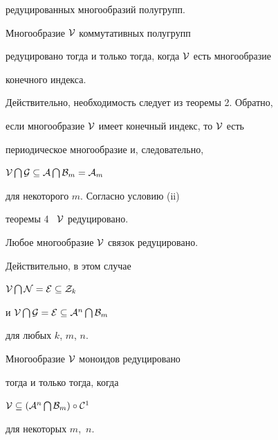 редуцированных многообразий полугрупп.





\begin{cor}


Многообразие ${\cal V}$ коммутативных полугрупп


редуцировано тогда и только тогда, когда ${\cal V}$ есть многообразие


конечного индекса.


\end{cor} 





Действительно, необходимость следует из теоремы 2. Обратно,


если многообразие ${\cal V}$ имеет конечный индекс, то ${\cal V}$ есть


периодическое многообразие и, следовательно,


${\cal V}\bigcap {\cal G} \subseteq {\cal A}\bigcap {\cal B}_m={\cal A}_m$


для некоторого $m$. Согласно условию (ii) 


теоремы 4 \ ${\cal V}$ редуцировано.





\begin{cor}


Любое многообразие ${\cal V}$ связок редуцировано.


\end{cor}





Действительно, в этом случае


${\cal V}\bigcap {\cal N}= {\cal E}\subseteq {\cal Z}_k$


и ${\cal V}\bigcap {\cal G}={\cal E} \subseteq {\cal A}^n\bigcap {\cal B}_m$


для любых $k$, $m$, $n$.





\begin{thm}


Многообразие ${\cal V}$ моноидов редуцировано


тогда и только тогда, когда


${\cal V}\subseteq ({\cal A}^n\bigcap {\cal B}_m) \circ {\cal C}^1$


для некоторых $m$,~$n$.


\end{thm} 





